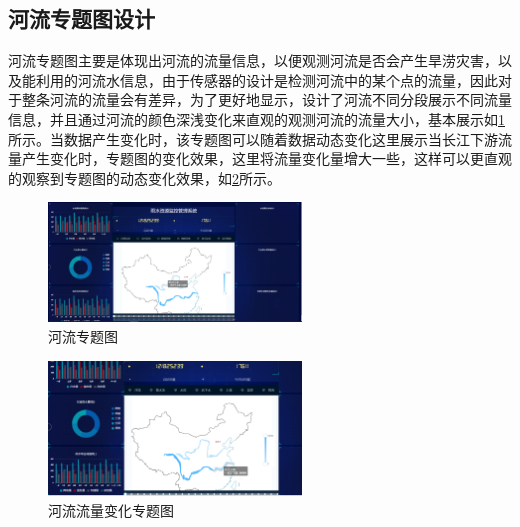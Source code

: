 \subsection{河流专题图设计}
河流专题图主要是体现出河流的流量信息，以便观测河流是否会产生旱涝灾害，以及能利用的河流水信息，由于传感器的设计是检测河流中的某个点的流量，因此对于整条河流的流量会有差异，为了更好地显示，设计了河流不同分段展示不同流量信息，并且通过河流的颜色深浅变化来直观的观测河流的流量大小，基本展示如\ref{fig:heliu}所示。当数据产生变化时，该专题图可以随着数据动态变化这里展示当长江下游流量产生变化时，专题图的变化效果，这里将流量变化量增大一些，这样可以更直观的观察到专题图的动态变化效果，如\ref{fig:heliubianhua}所示。
\begin{figure}[!htb]%
	\centering
	\includegraphics[width=0.60\textwidth]{figs/river_1.png}
	\caption{河流专题图}
	\label{fig:heliu}
\end{figure}

\begin{figure}[!htb]%
	\centering
	\includegraphics[width=0.60\textwidth]{figs/bianhua.png}
	\caption{河流流量变化专题图}
	\label{fig:heliubianhua}
\end{figure}
